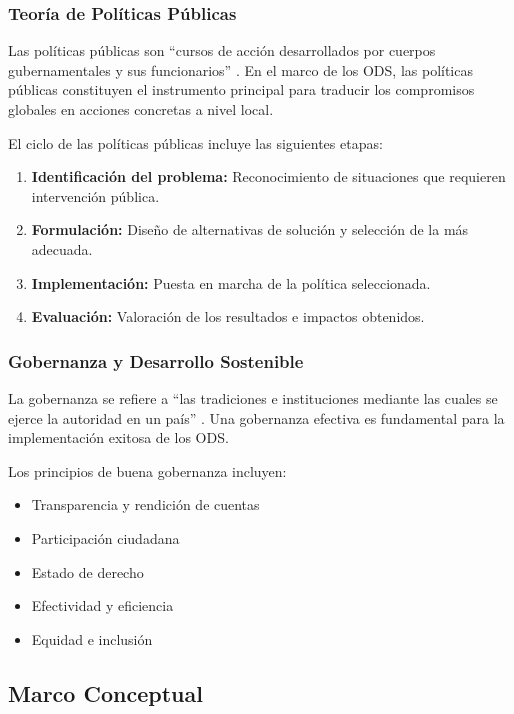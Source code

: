 \subsubsection{Teoría de Políticas Públicas}

Las políticas públicas son ``cursos de acción desarrollados por cuerpos gubernamentales y sus funcionarios'' \citep{anderson_2015}. En el marco de los ODS, las políticas públicas constituyen el instrumento principal para traducir los compromisos globales en acciones concretas a nivel local.

El ciclo de las políticas públicas incluye las siguientes etapas:

\begin{enumerate}
    \item \textbf{Identificación del problema:} Reconocimiento de situaciones que requieren intervención pública.
    \item \textbf{Formulación:} Diseño de alternativas de solución y selección de la más adecuada.
    \item \textbf{Implementación:} Puesta en marcha de la política seleccionada.
    \item \textbf{Evaluación:} Valoración de los resultados e impactos obtenidos.
\end{enumerate}

\subsubsection{Gobernanza y Desarrollo Sostenible}

La gobernanza se refiere a ``las tradiciones e instituciones mediante las cuales se ejerce la autoridad en un país'' \citep{banco_mundial_2017}. Una gobernanza efectiva es fundamental para la implementación exitosa de los ODS.

Los principios de buena gobernanza incluyen:

\begin{itemize}
    \item Transparencia y rendición de cuentas
    \item Participación ciudadana
    \item Estado de derecho
    \item Efectividad y eficiencia
    \item Equidad e inclusión
\end{itemize}

\subsection{Marco Conceptual}

